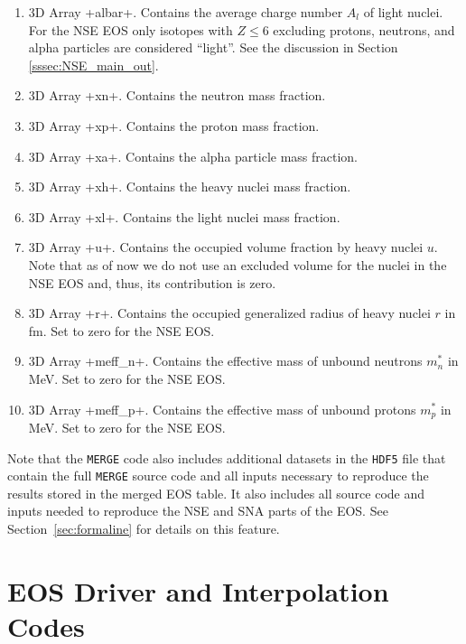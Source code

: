 \documentclass[letterpaper,11pt]{refart}
\begin{document}
\begin{enumerate}
 \item 3D Array \verbprm+albar+. Contains the average charge number $A_l$ of 
   light nuclei. For the NSE EOS only isotopes with $Z\leq6$ excluding protons, 
   neutrons, and alpha particles are considered ``light''. 
   See the discussion in Section \ref{sssec:NSE_main_out}. 
   
 \item 3D Array \verbprm+xn+. Contains the neutron mass fraction. 

 \item 3D Array \verbprm+xp+. Contains the proton mass fraction. 

 \item 3D Array \verbprm+xa+. Contains the alpha particle mass fraction. 

 \item 3D Array \verbprm+xh+. Contains the heavy nuclei mass fraction. 
 
 \item 3D Array \verbprm+xl+. Contains the light nuclei mass fraction. 

 \item 3D Array \verbprm+u+. Contains the occupied volume fraction by
   heavy nuclei $u$. Note that as of now we do not use an excluded volume for 
   the nuclei in the NSE EOS and, thus, its contribution is zero. 

 \item 3D Array \verbprm+r+. Contains the occupied generalized radius
   of heavy nuclei $r$ in fm. Set to zero for the NSE EOS. 

 \item 3D Array \verbprm+meff_n+. Contains the effective mass of unbound 
   neutrons $m^*_n$ in MeV. Set to zero for the NSE EOS. 

 \item 3D Array \verbprm+meff_p+. Contains the effective mass of
   unbound protons $m^*_p$ in MeV. Set to zero for the NSE EOS. 

\end{enumerate}

\smallskip
Note that the \texttt{MERGE} code also includes additional datasets in
the \texttt{HDF5} file that contain the full \texttt{MERGE} source
code and all inputs necessary to reproduce the results stored in the
merged EOS table. It also includes all source code and inputs needed
to reproduce the NSE and SNA parts of the EOS. See
Section~\ref{sec:formaline} for details on this feature.


\section{EOS Driver and Interpolation Codes}
\end{document}
